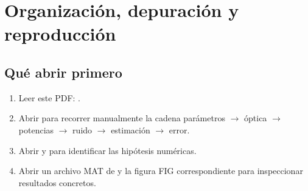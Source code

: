 \section{Organización, depuración y reproducción}
\subsection{Qué abrir primero}
\begin{enumerate}
\item Leer este PDF: .
\item Abrir  para recorrer manualmente la cadena parámetros $\to$ óptica $\to$ potencias $\to$ ruido $\to$ estimación $\to$ error.
\item Abrir  y  para identificar las hipótesis numéricas.
\item Abrir un archivo MAT de  y la figura FIG correspondiente para inspeccionar resultados concretos.
\end{enumerate}

